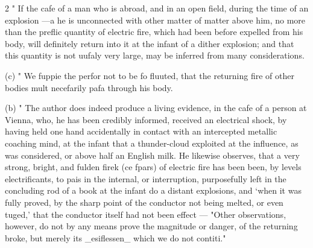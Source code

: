 \documentclass[10pt]{article}
\begin{document}
\begin{multicols}{2}
" If the cafe of a man who is abroad, and in an open field, during the time of an explosion —a he is unconnected with other matter of matter above him, no more than the preflic quantity of electric fire, which had been before expelled from his body, will definitely return into it at the infant of a dither explosion; and that this quantity is not uufaly very large, may be inferred from many considerations.

\end{multicols}
(c) " We fuppie the perfor not to be fo fluuted, that the returning fire of other bodies mult necefarily pafa through his body.

(b) " The author does indeed produce a living evidence, in the cafe of a person at Vienna, who, he has been credibly informed, received an electrical shock, by having held one hand accidentally in contact with an intercepted metallic coaching mind, at the infant that a thunder-cloud exploited at the influence, as was considered, or above half an English milk. He likewise observes, that a very strong, bright, and fulden firek (ce fpars) of electric fire has been been, by levels electrificants, to pais in the internal, or interruption, purposefully left in the concluding rod of a book at the infant do a distant explosions, and ‘when it was fully proved, by the sharp point of the conductor not being melted, or even tuged,' that the conductor itself had not been effect — "Other observations, however, do not by any means prove the magnitude or danger, of the returning broke, but merely its \_esiflessen\_ which we do not contiti."
\end{document}
